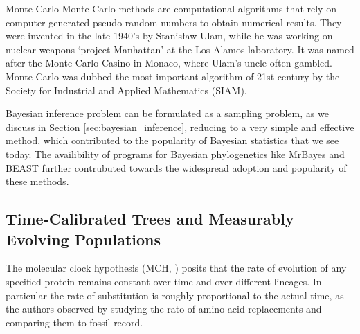 \begin{remark}{Monte Carlo}
Monte Carlo methods are computational algorithms that rely on computer generated pseudo-random numbers to obtain numerical results. 
They were invented in the late 1940's by Stanis\l{}aw Ulam, while he was working on nuclear weapons `project Manhattan'
at the Los Alamos laboratory.  
It was named after the Monte Carlo Casino in Monaco, where Ulam's uncle often gambled.
Monte Carlo was dubbed the most important algorithm of 21st century by the Society for Industrial and Applied Mathematics (SIAM).
\end{remark}

Bayesian inference problem can be formulated as a sampling problem, as we discuss in Section \ref{sec:bayesian_inference}, reducing to a very simple and effective method, which contributed to the popularity of Bayesian statistics that we see today. 
The availibility of programs for Bayesian phylogenetics like MrBayes \citep{Huelsenbeck2001} and BEAST \citep{Drummond2012} further contrubuted towards the widespread adoption and popularity of these methods.

\subsection{Time-Calibrated Trees and Measurably Evolving Populations\label{sub:clocks}}

The molecular clock hypothesis (MCH, \cite{Zuckerkandl1962}) posits that the rate of evolution of any specified protein remains constant over time and over different lineages.
In particular the rate of substitution is roughly proportional to the actual time, as the authors observed by studying the rato of amino acid replacements and comparing them to fossil record.


